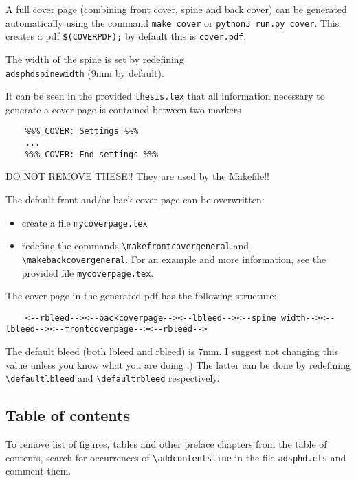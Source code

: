 A full cover page (combining front cover, spine and back cover) can be
generated automatically using the command \texttt{make cover} or \texttt{python3 run.py cover}. This creates a pdf
\texttt{\$(COVERPDF);} by default this is \texttt{cover.pdf}.

The width of the spine is set by redefining \texttt{\\adsphdspinewidth} (9mm by default).

It can be seen in the provided \texttt{thesis.tex} that all information necessary to
generate a cover page is contained between two markers

\begin{verbatim}
    %%% COVER: Settings %%%
    ...
    %%% COVER: End settings %%%
\end{verbatim}

DO NOT REMOVE THESE!! They are used by the Makefile!!

The default front and/or back cover page can be overwritten:

\begin{itemize}
    \item create a file \texttt{mycoverpage.tex}
    \item redefine the commands \texttt{\textbackslash makefrontcovergeneral} and \texttt{\textbackslash makebackcovergeneral}. For
          an example and more information, see the provided file \texttt{mycoverpage.tex}.
\end{itemize}

The cover page in the generated pdf has the following structure:

{\tiny
\begin{verbatim}
    <--rbleed--><--backcoverpage--><--lbleed--><--spine width--><--lbleed--><--frontcoverpage--><--rbleed-->
\end{verbatim}
}

The default bleed (both lbleed and rbleed) is 7mm. I suggest not changing this
value unless you know what you are doing ;) The latter can be done by
redefining \texttt{\textbackslash defaultlbleed} and \texttt{\textbackslash defaultrbleed} respectively.


\subsection{Table of contents}

To remove list of figures, tables and other preface chapters from the table of
contents, search for occurrences of \texttt{\textbackslash addcontentsline} in the file
\texttt{adsphd.cls} and comment them.

